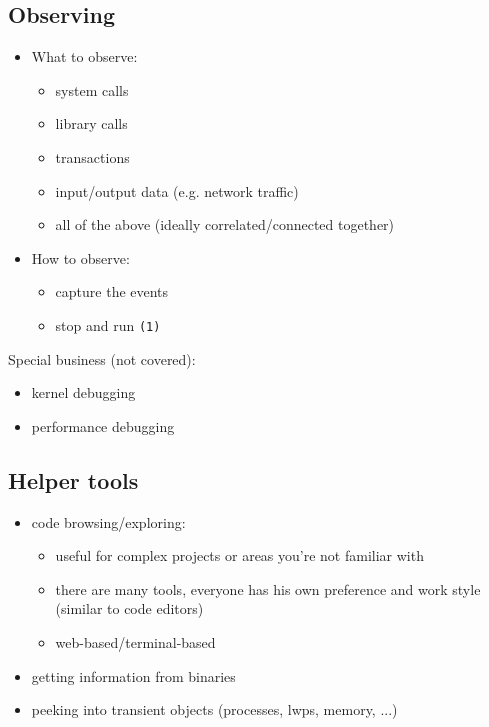 \subsection{Observing}

\begin{itemize}
  \item What to observe:
  \begin{itemize}
  \item system calls
  \item library calls
  \item transactions
  \item input/output data (e.g. network traffic)
  \item all of the above (ideally correlated/connected together)
  \end{itemize}
  \item How to observe:
  \begin{itemize}
  \item capture the events
  \item stop and run \texttt{(1)}
  \end{itemize}
\end{itemize}


Special business (not covered):
\begin{itemize}
  \item kernel debugging
  \item performance debugging
\end{itemize}

\subsection{Helper tools}

\begin{itemize}
\item code browsing/exploring:
  \begin{itemize}
    \item useful for complex projects or areas you're not familiar with
    \item there are many tools, everyone has his own preference and work style
       (similar to code editors)
    \item web-based/terminal-based
  \end{itemize}
  \item getting information from binaries
  \item peeking into transient objects (processes, lwps, memory, ...)
\end{itemize}


